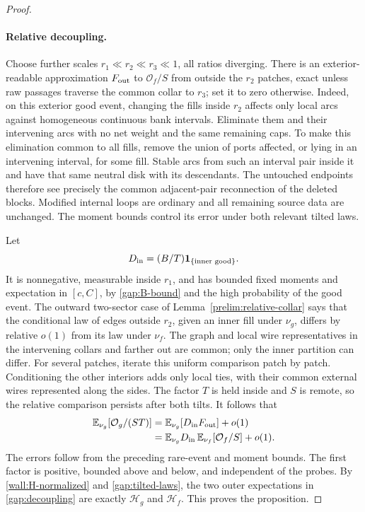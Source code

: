 \begin{proof}
\paragraph{Relative decoupling.}
Choose further scales
$r_1\ll r_2\ll r_3\ll1$, all ratios diverging.  There is an
exterior-readable approximation $F_{\rm out}$ to $\mathcal O_f/S$
from outside the $r_2$ patches, exact unless raw passages traverse
the common collar to $r_3$; set it to zero otherwise.  Indeed, on this
exterior good event, changing the fills inside $r_2$ affects only
local arcs against homogeneous continuous bank intervals.  Eliminate
them and their intervening arcs with no net weight and the same
remaining caps.  To make this elimination common to all fills,
remove the union of ports affected, or lying in an intervening
interval, for some fill.  Stable arcs from such an interval pair
inside it and have that same neutral disk with its descendants.
The untouched endpoints therefore see precisely the common
adjacent-pair reconnection of the deleted blocks.  Modified internal
loops are ordinary and all remaining source data are unchanged.
The moment bounds control its error under both relevant tilted laws.

Let
\begin{equation}
 D_{\rm in}=(B/T)\mathbf1_{\{\text{inner good}\}}.
 \label{gap:D-inner}
\end{equation}
It is nonnegative, measurable inside $r_1$, and has bounded fixed
moments and expectation in $[c,C]$, by \eqref{gap:B-bound} and the
high probability of the good event.  The outward two-sector case of
Lemma~\ref{prelim:relative-collar} says that the conditional law of edges outside
$r_2$, given an inner fill under $\nu_g$, differs by relative $o(1)$
from its law under $\nu_f$.  The graph and local wire representatives
in the intervening collars and farther out are common; only the inner
partition can differ.  For several patches, iterate this uniform
comparison patch by patch.  Conditioning the other interiors adds
only local ties, with their common external wires represented along
the sides.  The factor $T$ is held inside and $S$ is remote, so the
relative comparison persists after both tilts.  It follows that
\begin{align}
 \mathbb E_{\nu_g}[\mathcal O_g/(ST)]
 &=\mathbb E_{\nu_g}[D_{\rm in}F_{\rm out}]+o(1)\notag\\
 &=\mathbb E_{\nu_g}D_{\rm in}\,
       \mathbb E_{\nu_f}[\mathcal O_f/S]+o(1).
 \label{gap:decoupling}
\end{align}
The errors follow from the preceding rare-event and moment bounds.
The first factor is positive, bounded above and below, and independent
of the probes.  By \eqref{wall:H-normalized} and
\eqref{gap:tilted-laws}, the two outer expectations in
\eqref{gap:decoupling} are exactly $\mathcal H_g$ and $\mathcal H_f$.
This proves the proposition.
\end{proof}

